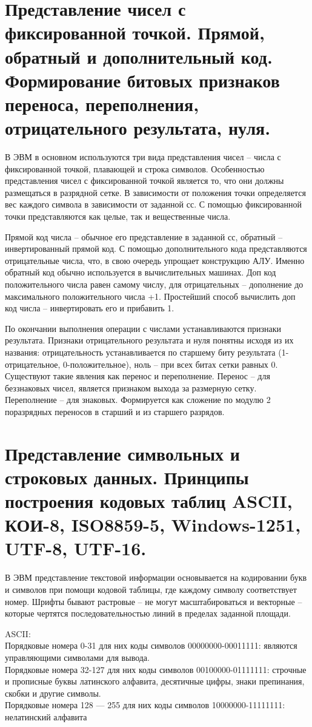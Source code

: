 \documentclass{article}
\begin{document}
\section{Представление чисел с фиксированной точкой. Прямой, обратный и дополнительный код. Формирование битовых признаков переноса, переполнения, отрицательного результата, нуля.}
В ЭВМ в основном используются три вида представления чисел – числа с фиксированной точкой, плавающей и строка символов. 
Особенностью представления чисел с фиксированной точкой является то, что они должны размещаться в разрядной сетке. 
В зависимости от положения точки определяется вес каждого символа в зависимости от заданной сс.
С помощью фиксированной точки представляются как целые, так и вещественные числа.


Прямой код числа – обычное его представление в заданной сс, обратный – инвертированный прямой код. 
С помощью дополнительного кода представляются отрицательные числа, что, в свою очередь упрощает конструкцию АЛУ. 
Именно обратный код обычно используется в вычислительных машинах. 
Доп код положительного числа равен самому числу, для отрицательных – дополнение до максимального положительного числа +1. 
Простейший способ вычислить доп код числа – инвертировать его и прибавить 1.


По окончании выполнения операции с числами устанавливаются признаки результата. 
Признаки отрицательного результата и нуля понятны исходя из их названия: отрицательность устанавливается по старшему биту результата (1-отрицательное, 0-положительное), 
ноль – при всех битах сетки равных 0. Существуют такие явления как перенос и переполнение. 
Перенос – для беззнаковых чисел, является признаком выхода за размерную сетку. 
Переполнение – для знаковых. Формируется как сложение по модулю 2 поразрядных переносов в старший и из старшего разрядов. 

\section{Представление символьных и строковых данных. Принципы построения кодовых таблиц ASCII, КОИ-8, ISO8859-5, Windows-1251, UTF-8, UTF-16.}
В ЭВМ представление текстовой информации основывается на кодировании букв и символов при помощи кодовой таблицы, где каждому символу соответствует номер. 
Шрифты бывают растровые – не могут масштабироваться и векторные – которые чертятся последовательностью линий в пределах заданной площади.


ASCII:\\
Порядковые номера 0-31 для них коды символов 00000000-00011111: являются управляющими символами для вывода.\\
Порядковые номера 32-127 для них коды символов 00100000-01111111: строчные и прописные буквы латинского алфавита, десятичные цифры, знаки препинания, скобки и другие символы.\\
Порядковые номера 128 — 255 для них коды символов 10000000-11111111: нелатинский алфавита
\end{document}

